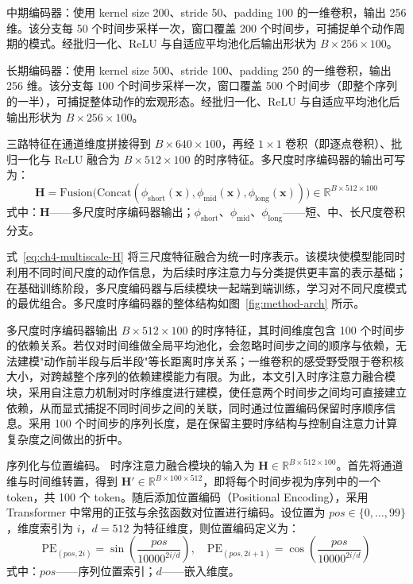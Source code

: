 中期编码器：使用 kernel size 200、stride 50、padding 100 的一维卷积，输出 256 维。该分支每 50 个时间步采样一次，窗口覆盖 200 个时间步，可捕捉单个动作周期的模式。经批归一化、ReLU 与自适应平均池化后输出形状为 $B \times 256 \times 100$。

长期编码器：使用 kernel size 500、stride 100、padding 250 的一维卷积，输出 256 维。该分支每 100 个时间步采样一次，窗口覆盖 500 个时间步（即整个序列的一半），可捕捉整体动作的宏观形态。经批归一化、ReLU 与自适应平均池化后输出形状为 $B \times 256 \times 100$。

三路特征在通道维度拼接得到 $B \times 640 \times 100$，再经 $1 \times 1$ 卷积（即逐点卷积）、批归一化与 ReLU 融合为 $B \times 512 \times 100$ 的时序特征。多尺度时序编码器的输出可写为：
\begin{equation}\label{eq:ch4-multiscale-H}
  \mathbf{H} = \mathrm{Fusion}\big(\mathrm{Concat}(\phi_{\mathrm{short}}(\mathbf{x}), \phi_{\mathrm{mid}}(\mathbf{x}), \phi_{\mathrm{long}}(\mathbf{x}))\big) \in \mathbb{R}^{B \times 512 \times 100}
\end{equation}
\noindent 式中：$\mathbf{H}$——多尺度时序编码器输出；$\phi_{\mathrm{short}}$、$\phi_{\mathrm{mid}}$、$\phi_{\mathrm{long}}$——短、中、长尺度卷积分支。

式~\eqref{eq:ch4-multiscale-H} 将三尺度特征融合为统一时序表示。该模块使模型能同时利用不同时间尺度的动作信息，为后续时序注意力与分类提供更丰富的表示基础；在基础训练阶段，多尺度编码器与后续模块一起端到端训练，学习对不同尺度模式的最优组合。多尺度时序编码器的整体结构如图~\ref{fig:method-arch} 所示。


多尺度时序编码器输出 $B \times 512 \times 100$ 的时序特征，其时间维度包含 100 个时间步的依赖关系。若仅对时间维做全局平均池化，会忽略时间步之间的顺序与依赖，无法建模"动作前半段与后半段"等长距离时序关系；一维卷积的感受野受限于卷积核大小，对跨越整个序列的依赖建模能力有限。为此，本文引入时序注意力融合模块，采用自注意力机制对时序维度进行建模，使任意两个时间步之间均可直接建立依赖，从而显式捕捉不同时间步之间的关联，同时通过位置编码保留时序顺序信息。采用 100 个时间步的序列长度，是在保留主要时序结构与控制自注意力计算复杂度之间做出的折中。

序列化与位置编码。 时序注意力融合模块的输入为 $\mathbf{H} \in \mathbb{R}^{B \times 512 \times 100}$。首先将通道维与时间维转置，得到 $\mathbf{H}' \in \mathbb{R}^{B \times 100 \times 512}$，即将每个时间步视为序列中的一个 token，共 100 个 token。随后添加位置编码（Positional Encoding），采用 Transformer\cite{vaswani2017attention} 中常用的正弦与余弦函数对位置进行编码。设位置为 $pos \in \{0, \ldots, 99\}$，维度索引为 $i$，$d=512$ 为特征维度，则位置编码定义为：
\begin{equation}\label{eq:ch4-pe}
  \mathrm{PE}_{(pos, 2i)} = \sin\!\left(\frac{pos}{10000^{2i/d}}\right), \quad
  \mathrm{PE}_{(pos, 2i+1)} = \cos\!\left(\frac{pos}{10000^{2i/d}}\right)
\end{equation}
\noindent 式中：$pos$——序列位置索引；$d$——嵌入维度。

